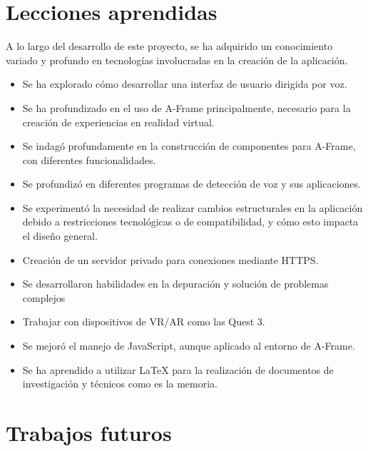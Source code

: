 \documentclass[a4paper, 12pt]{book}
\begin{document}
\section{Lecciones aprendidas}
\label{sec:lecciones_aprendidas}
A lo largo del desarrollo de este proyecto, se ha adquirido un conocimiento variado y profundo en tecnologías involucradas en la creación de la aplicación.
\begin{itemize}
  \item Se ha explorado cómo desarrollar una interfaz de usuario dirigida por voz.
  \item Se ha profundizado en el uso de A-Frame principalmente, necesario para la creación de experiencias en realidad virtual.
  \item Se indagó profundamente en la construcción de componentes para A-Frame, con diferentes funcionalidades.
  \item Se profundizó en diferentes programas de detección de voz y sus aplicaciones.
  \item Se experimentó la necesidad de realizar cambios estructurales en la aplicación debido a restricciones tecnológicas o de compatibilidad, y cómo esto impacta el diseño general.
  \item Creación de un servidor privado para conexiones mediante HTTPS.
  \item Se desarrollaron habilidades en la depuración y solución de problemas complejos
  \item Trabajar con dispositivos de VR/AR como las Quest 3.
  \item Se mejoró el manejo de JavaScript, aunque aplicado al entorno de A-Frame.
  \item Se ha aprendido a utilizar LaTeX para la realización de documentos de investigación y técnicos como es la memoria.
\end{itemize}


\section{Trabajos futuros}
\label{sec:trabajos_futuros}
\end{document}

